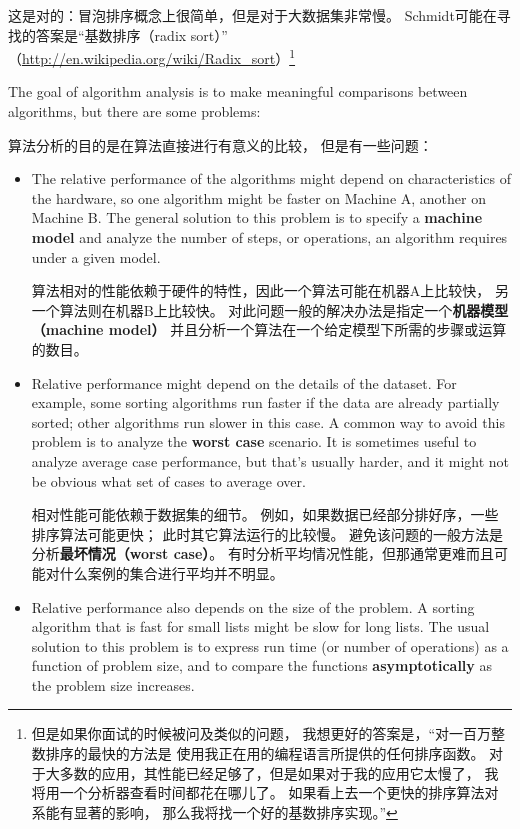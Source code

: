\documentclass[10pt]{book}
\begin{document}
\begin{CJK}{UTF8}{gbsn}
这是对的：冒泡排序概念上很简单，但是对于大数据集非常慢。
Schmidt可能在寻找的答案是``基数排序（radix sort）''
（\url{http://en.wikipedia.org/wiki/Radix_sort}）\footnote{
但是如果你面试的时候被问及类似的问题，
我想更好的答案是，``对一百万整数排序的最快的方法是
使用我正在用的编程语言所提供的任何排序函数。
对于大多数的应用，其性能已经足够了，但是如果对于我的应用它太慢了，
我将用一个分析器查看时间都花在哪儿了。
如果看上去一个更快的排序算法对系能有显著的影响，
那么我将找一个好的基数排序实现。''}

The goal of algorithm analysis is to make meaningful
comparisons between algorithms, but there are some problems:

算法分析的目的是在算法直接进行有意义的比较，
但是有一些问题：

\begin{itemize}

\item The relative performance of the algorithms might
depend on characteristics of the hardware, so one algorithm
might be faster on Machine A, another on Machine B.
The general solution to this problem is to specify a
{\bf machine model} and analyze the number of steps, or
operations, an algorithm requires under a given model.

算法相对的性能依赖于硬件的特性，因此一个算法可能在机器A上比较快，
另一个算法则在机器B上比较快。
对此问题一般的解决办法是指定一个{\bf 机器模型（machine model）}
并且分析一个算法在一个给定模型下所需的步骤或运算的数目。

\item Relative performance might depend on the details of
the dataset.  For example, some sorting
algorithms run faster if the data are already partially sorted;
other algorithms run slower in this case.
A common way to avoid this problem is to analyze the
{\bf worst case} scenario.  It is sometimes useful to
analyze average case performance, but that's usually harder,
and it might not be obvious what set of cases to average over.

相对性能可能依赖于数据集的细节。
例如，如果数据已经部分排好序，一些排序算法可能更快；
此时其它算法运行的比较慢。
避免该问题的一般方法是分析{\bf 最坏情况（worst case）}。
有时分析平均情况性能，但那通常更难而且可能对什么案例的集合进行平均并不明显。

\item Relative performance also depends on the size of the
problem.  A sorting algorithm that is fast for small lists
might be slow for long lists.
The usual solution to this problem is to express run time
(or number of operations) as a function of problem size,
and to compare the functions {\bf asymptotically} as the problem
size increases.


\end{itemize}
\end{CJK}
\end{document}
